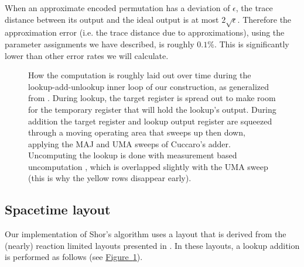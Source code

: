 \documentclass[superscriptaddress,notitlepage,longbibliography]{revtex4-1}
\theoremstyle{definition}
\theoremstyle{definition}
\newcommand{\fig}[1]{\hyperref[fig:#1]{Figure~\ref*{fig:#1}}}
\begin{document}
When an approximate encoded permutation has a deviation of $\epsilon$, the trace distance between its output and the ideal output is at most $2 \sqrt{\epsilon}$.
Therefore the approximation error (i.e. the trace distance due to approximations), using the parameter assignments we have described, is roughly $0.1\%$.
This is significantly lower than other error rates we will calculate.


\begin{figure}
    \label{fig:time-bars}
    \caption{
        How the computation is roughly laid out over time during the lookup-add-unlookup inner loop of our construction, as generalized from \cite{gidney2019autoccz}.
        During lookup, the target register is spread out to make room for the temporary register that will hold the lookup's output.
        During addition the target register and lookup output register are squeezed through a moving operating area that sweeps up then down, applying the MAJ and UMA sweeps of Cuccaro's adder.
        Uncomputing the lookup is done with measurement based uncomputation \cite{berry2019qubitization}, which is overlapped slightly with the UMA sweep (this is why the yellow rows disappear early).
    }
\end{figure}

\subsection{Spacetime layout}

Our implementation of Shor's algorithm uses a layout that is derived from the (nearly) reaction limited layouts presented in \cite{gidney2019autoccz}.
In these layouts, a lookup addition is performed as follows (see \fig{time-bars}).
\end{document}
